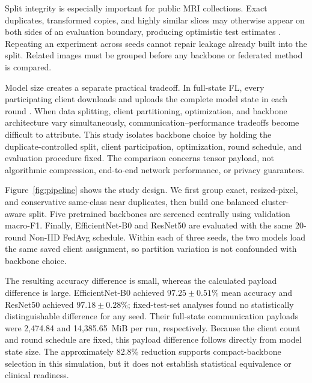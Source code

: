 \documentclass[conference]{IEEEtran}
\begin{document}
Split integrity is especially important for public MRI collections. Exact duplicates, transformed copies, and highly similar slices may otherwise appear on both sides of an evaluation boundary, producing optimistic test estimates \cite{melo2026exploiting,siam2026brain,naseer2026medfl}. Repeating an experiment across seeds cannot repair leakage already built into the split. Related images must be grouped before any backbone or federated method is compared.

Model size creates a separate practical tradeoff. In full-state FL, every participating client downloads and uploads the complete model state in each round \cite{mcmahan2017fedavg,radhika2026communication,zhou2022communication}. When data splitting, client partitioning, optimization, and backbone architecture vary simultaneously, communication--performance tradeoffs become difficult to attribute. This study isolates backbone choice by holding the duplicate-controlled split, client participation, optimization, round schedule, and evaluation procedure fixed. The comparison concerns tensor payload, not algorithmic compression, end-to-end network performance, or privacy guarantees.

Figure~\ref{fig:pipeline} shows the study design. We first group exact, resized-pixel, and conservative same-class near duplicates, then build one balanced cluster-aware split. Five pretrained backbones are screened centrally using validation macro-F1. Finally, EfficientNet-B0 and ResNet50 are evaluated with the same 20-round Non-IID FedAvg schedule. Within each of three seeds, the two models load the same saved client assignment, so partition variation is not confounded with backbone choice.

The resulting accuracy difference is small, whereas the calculated payload difference is large. EfficientNet-B0 achieved $97.25\pm0.51$\% mean accuracy and ResNet50 achieved $97.18\pm0.28$\%; fixed-test-set analyses found no statistically distinguishable difference for any seed. Their full-state communication payloads were 2,474.84 and 14,385.65~MiB per run, respectively. Because the client count and round schedule are fixed, this payload difference follows directly from model state size. The approximately 82.8\% reduction supports compact-backbone selection in this simulation, but it does not establish statistical equivalence or clinical readiness.
\end{document}
